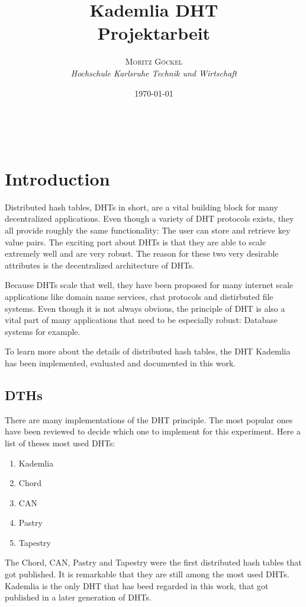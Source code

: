 \documentclass[a4paper, 12pt]{article} %
\title{\textbf{Kademlia DHT}\\ %
Projektarbeit} %
\author{\textsc{Moritz G\"ockel} %
\\{\textit{Hochschule Karlsruhe Technik und Wirtschaft}}} %
\date{\today}
\makeatletter
\renewcommand{\maketitle}{ 
\begin{flushright} %
{\LARGE\@title} %

\vspace{50pt} %

{\large\@author}
\\\@date 

\vspace{40pt}
\end{flushright}
}
\makeatother
\begin{document}
\maketitle

\vspace{30pt}

\newpage
\tableofcontents

\newpage
\section{Introduction}

Distributed hash tables, DHTs in short, are a vital building block for many decentralized applications. Even though a variety of DHT protocols exists, they all provide roughly the same functionality: The user can store and retrieve key value pairs. The exciting part about DHTs is that they are able to scale extremely well and are very robust. The reason for these two very desirable attributes is the decentralized architecture of DHTs.

Because DHTs scale that well, they have been proposed for many internet scale applications like domain name services, chat protocols and distirbuted file systems. Even though it is not always obvious, the principle of DHT is also a vital part of many applications that need to be especially robust: Database systems for example.

To learn more about the details of distributed hash tables, the DHT Kademlia has been implemented, evaluated and documented in this work.

\subsection{DTHs}

There are many implementations of the DHT principle. The most popular ones have been reviewed to decide which one to implement for this experiment. Here a list of theses most used DHTs:

\begin{enumerate}
\item Kademlia
\item Chord
\item CAN
\item Pastry
\item Tapestry
\end{enumerate}

The Chord, CAN, Pastry and Tapestry were the first distributed hash tables that got published. It is remarkable that they are still among the most used DHTs. Kademlia is the only DHT that has beed regarded in this work, that got published in a later generation of DHTs.
\end{document}
